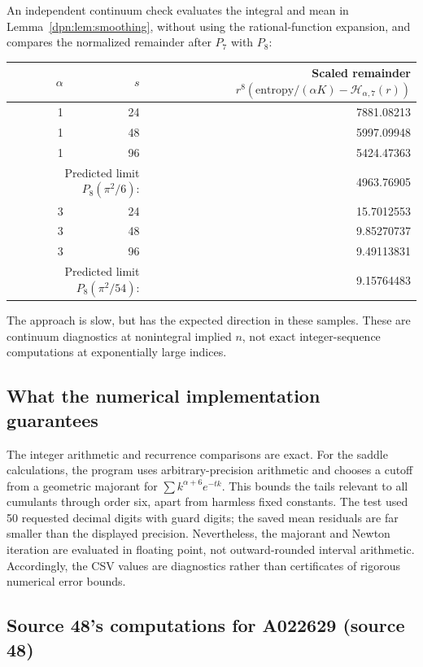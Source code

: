 \documentclass[11pt]{article}
\numberwithin{equation}{section}
\theoremstyle{definition}\newtheorem{definition}[theorem]{Definition}
\theoremstyle{remark}\newtheorem{remark}[theorem]{Remark}
\newcommand{\src}[1]{\textup{(source #1)}}
\begin{document}
An independent continuum check evaluates the integral and mean in
Lemma~\ref{dpn:lem:smoothing}, without using the rational-function expansion,
and compares the normalized remainder after $P_7$ with $P_8$:
\begin{center}
\begin{tabular}{rrr}
\toprule
$\alpha$ & $s$ & Scaled remainder $r^8(\text{entropy}/(\alpha K)-\mathscr H_{\alpha,7}(r))$\\
\midrule
1 & 24 & 7881.08213\\
1 & 48 & 5997.09948\\
1 & 96 & 5424.47363\\
\multicolumn{2}{r}{Predicted limit $P_8(\pi^2/6)$:} & 4963.76905\\
3 & 24 & 15.7012553\\
3 & 48 & 9.85270737\\
3 & 96 & 9.49113831\\
\multicolumn{2}{r}{Predicted limit $P_8(\pi^2/54)$:} & 9.15764483\\
\bottomrule
\end{tabular}
\end{center}
The approach is slow, but has the expected direction in these samples.
These are continuum diagnostics at nonintegral implied $n$, not exact
integer-sequence computations at exponentially large indices.

\subsection{What the numerical implementation guarantees}
The integer arithmetic and recurrence comparisons are exact. For the saddle
calculations, the program uses arbitrary-precision arithmetic and chooses a
cutoff from a geometric majorant for
$\sum k^{\alpha+6}e^{-tk}$. This bounds the tails relevant to all cumulants
through order six, apart from harmless fixed constants. The test used
50 requested decimal digits with guard digits; the saved mean residuals are
far smaller than the displayed precision. Nevertheless, the majorant and
Newton iteration are evaluated in floating point, not outward-rounded
interval arithmetic. Accordingly, the CSV values are diagnostics rather than
certificates of rigorous numerical error bounds.

\subsection{Source 48's computations for A022629 \src{48}}\label{dpn:48:sec:computations}
\end{document}
